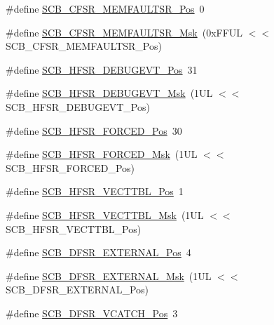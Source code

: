 \begin{DoxyCompactItemize}
\item 
\#define \hyperlink{group___c_m_s_i_s___s_c_b_ga91f41491cec5b5acca3fbc94efbd799e}{S\-C\-B\-\_\-\-C\-F\-S\-R\-\_\-\-M\-E\-M\-F\-A\-U\-L\-T\-S\-R\-\_\-\-Pos}~0
\item 
\#define \hyperlink{group___c_m_s_i_s___s_c_b_gad46716159a3808c9e7da22067d6bec98}{S\-C\-B\-\_\-\-C\-F\-S\-R\-\_\-\-M\-E\-M\-F\-A\-U\-L\-T\-S\-R\-\_\-\-Msk}~(0x\-F\-F\-U\-L $<$$<$ S\-C\-B\-\_\-\-C\-F\-S\-R\-\_\-\-M\-E\-M\-F\-A\-U\-L\-T\-S\-R\-\_\-\-Pos)
\item 
\#define \hyperlink{group___c_m_s_i_s___s_c_b_ga300c90cfb7b35c82b4d44ad16c757ffb}{S\-C\-B\-\_\-\-H\-F\-S\-R\-\_\-\-D\-E\-B\-U\-G\-E\-V\-T\-\_\-\-Pos}~31
\item 
\#define \hyperlink{group___c_m_s_i_s___s_c_b_gababd60e94756bb33929d5e6f25d8dba3}{S\-C\-B\-\_\-\-H\-F\-S\-R\-\_\-\-D\-E\-B\-U\-G\-E\-V\-T\-\_\-\-Msk}~(1\-U\-L $<$$<$ S\-C\-B\-\_\-\-H\-F\-S\-R\-\_\-\-D\-E\-B\-U\-G\-E\-V\-T\-\_\-\-Pos)
\item 
\#define \hyperlink{group___c_m_s_i_s___s_c_b_gab361e54183a378474cb419ae2a55d6f4}{S\-C\-B\-\_\-\-H\-F\-S\-R\-\_\-\-F\-O\-R\-C\-E\-D\-\_\-\-Pos}~30
\item 
\#define \hyperlink{group___c_m_s_i_s___s_c_b_ga6560d97ed043bc01152a7247bafa3157}{S\-C\-B\-\_\-\-H\-F\-S\-R\-\_\-\-F\-O\-R\-C\-E\-D\-\_\-\-Msk}~(1\-U\-L $<$$<$ S\-C\-B\-\_\-\-H\-F\-S\-R\-\_\-\-F\-O\-R\-C\-E\-D\-\_\-\-Pos)
\item 
\#define \hyperlink{group___c_m_s_i_s___s_c_b_ga77993da8de35adea7bda6a4475f036ab}{S\-C\-B\-\_\-\-H\-F\-S\-R\-\_\-\-V\-E\-C\-T\-T\-B\-L\-\_\-\-Pos}~1
\item 
\#define \hyperlink{group___c_m_s_i_s___s_c_b_gaac5e289211d0a63fe879a9691cb9e1a9}{S\-C\-B\-\_\-\-H\-F\-S\-R\-\_\-\-V\-E\-C\-T\-T\-B\-L\-\_\-\-Msk}~(1\-U\-L $<$$<$ S\-C\-B\-\_\-\-H\-F\-S\-R\-\_\-\-V\-E\-C\-T\-T\-B\-L\-\_\-\-Pos)
\item 
\#define \hyperlink{group___c_m_s_i_s___s_c_b_ga13f502fb5ac673df9c287488c40b0c1d}{S\-C\-B\-\_\-\-D\-F\-S\-R\-\_\-\-E\-X\-T\-E\-R\-N\-A\-L\-\_\-\-Pos}~4
\item 
\#define \hyperlink{group___c_m_s_i_s___s_c_b_ga3cba2ec1f588ce0b10b191d6b0d23399}{S\-C\-B\-\_\-\-D\-F\-S\-R\-\_\-\-E\-X\-T\-E\-R\-N\-A\-L\-\_\-\-Msk}~(1\-U\-L $<$$<$ S\-C\-B\-\_\-\-D\-F\-S\-R\-\_\-\-E\-X\-T\-E\-R\-N\-A\-L\-\_\-\-Pos)
\item 
\#define \hyperlink{group___c_m_s_i_s___s_c_b_gad02d3eaf062ac184c18a7889c9b6de57}{S\-C\-B\-\_\-\-D\-F\-S\-R\-\_\-\-V\-C\-A\-T\-C\-H\-\_\-\-Pos}~3
\item 
$$
\end{DoxyCompactItemize}
